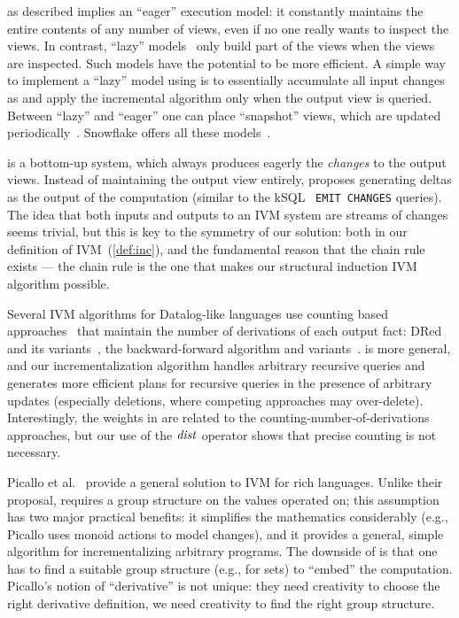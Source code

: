\dbsp as described implies an ``eager'' execution model: it constantly
maintains the entire contents of any number of views, even if no one
really wants to inspect the views.  In contrast, ``lazy''
models~\cite{hanson-sigmod87} only build part of the views when the
views are inspected.  Such models have the potential to be more
efficient.  A simple way to implement a ``lazy'' model using \dbsp is
to essentially accumulate all input changes as \zrs and apply the
incremental algorithm only when the output view is queried.  Between
``lazy'' and ``eager'' one can place ``snapshot'' views, which are
updated periodically~\cite{colby-sigmod97}.  Snowflake offers all
these models~\cite{akidau-amd23}.

\dbsp is a bottom-up system, which always produces eagerly the
\emph{changes} to the output views.  Instead of maintaining the output
view entirely, \dbsp proposes generating deltas as the output of the
computation (similar to the kSQL~\cite{jafarpour-edbt19} \texttt{EMIT
  CHANGES} queries).  The idea that both inputs and outputs to an IVM
system are streams of changes seems trivial, but this is key to the
symmetry of our solution: both in our definition of
IVM~(\ref{def:inc}), and the fundamental reason that the chain rule
exists --- the chain rule is the one that makes our structural
induction IVM algorithm possible.

Several IVM algorithms for Datalog-like languages use counting based
approaches~\cite{Dewan-iis92,motik-aaai15} that maintain the number of
derivations of each output fact: DRed~\cite{gupta-sigmod93} and its
variants~\cite{Ceri-VLDB91,Wolfson-sigmod91,Staudt-vldb96,Kotowski-rr11,Lu-sigmod95,Apt-sigmod87},
the backward-for\-ward algorithm and
variants~\cite{motik-aaai15,Harrison-wdd92,motik-ai19}.  \dbsp is more
general, and our incrementalization algorithm handles arbitrary
recursive queries and generates more efficient plans for recursive
queries in the presence of arbitrary updates (especially deletions,
where competing approaches may over-delete).  Interestingly, the \zrs
weights in \dbsp are related to the counting-number-of-derivations
approaches, but our use of the $\mathit{dist}$ operator shows that precise
counting is not necessary.

Picallo et al.~\cite{picallo-scop19} provide a general solution to IVM
for rich languages.  Unlike their proposal, \dbsp requires a group
structure on the values operated on; this assumption has two major
practical benefits: it simplifies the mathematics considerably (e.g.,
Picallo uses monoid actions to model changes), and it provides a
general, simple algorithm for incrementalizing arbitrary programs.
The downside of \dbsp is that one has to find a suitable group
structure (e.g., \zrs for sets) to ``embed'' the computation.
Picallo's notion of ``derivative'' is not unique: they need creativity
to choose the right derivative definition, we need creativity to find
the right group structure.

